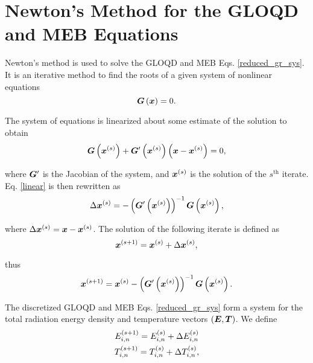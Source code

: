 \section{Newton's Method for the GLOQD and MEB Equations} \label{sec:newton}
	Newton's method \cite{kelley-newton} is used to solve the GLOQD and MEB Eqs. \eqref{reduced_gr_sys}. It is an iterative method to find the roots of a given system of nonlinear equations
	\begin{equation}
		\bm{G}\left(\bm{x}\right) = 0. \label{Gdef}
	\end{equation}
	
	The system of equations is linearized about some estimate of the solution to obtain
	\begin{equation}
		\bm{G}\left(\bm{x}^{\left( s\right)}\right) + \bm{G}'\left(\bm{x}^{\left( s\right)}\right)\left(\bm{x}-\bm{x}^{\left( s\right)}\right) = 0, \label{linear}
	\end{equation}
	
	where $\bm{G}'$ is the Jacobian of the system, and $\bm{x}^{\left( s\right)}$ is the solution of the $s^{\text{th}}$ iterate. Eq. \eqref{linear} is then rewritten as
	\begin{equation}
		\Delta \bm{x}^{\left( s\right)} =  - \left(\bm{G}'\left(\bm{x}^{\left( s\right)}\right)\right)^{-1}\bm{G}\left(\bm{x}^{\left( s\right)}\right),
	\end{equation}
	
	where $\Delta \bm{x}^{\left( s\right)} = \bm{x}-\bm{x}^{\left( s\right)}$. The solution of the following iterate is defined as
	\begin{equation}
		\bm{x}^{\left( s+1\right)} = \bm{x}^{\left( s\right)} + \Delta \bm{x}^{\left( s\right)},
	\end{equation}
	
	thus
	\begin{equation}
		\bm{x}^{\left( s+1\right)} = \bm{x}^{\left( s\right)} - \left(\bm{G}'\left(\bm{x}^{\left( s\right)}\right)\right)^{-1}\bm{G}\left(\bm{x}^{\left( s\right)}\right).
	\end{equation}
	
	The discretized GLOQD and MEB Eqs. \eqref{reduced_gr_sys} form a system for the total radiation energy density and temperature vectors $\left(\bm{E},\bm{T}\right)$. We define
	\begin{gather}
		E_{i,n}^{\left( s+1\right)} = E_{i,n}^{\left( s\right)} + \Delta E_{i,n}^{\left( s\right)} \label{dele}\\
		T_{i,n}^{\left( s+1\right)} = T_{i,n}^{\left( s\right)} + \Delta T_{i,n}^{\left( s\right)}, \label{delt}
	\end{gather}
	
